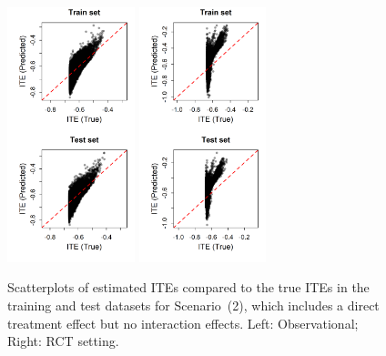 \begin{figure}[htbp]
\centering
\includegraphics[width=0.33\textwidth]{img/results/observ_scenario2_ITE_scatter_train_test.png}
\includegraphics[width=0.33\textwidth]{img/results/rct_scenario2_ITE_scatter_train_test.png}
\vspace{-17pt}
\caption{Scatterplots of estimated ITEs compared to the true ITEs in the training and test datasets for Scenario~(2), which includes a direct treatment effect but no interaction effects. Left: Observational; Right: RCT setting.}
\label{fig:scenario2_ite_scatter_train_test}
\end{figure}




